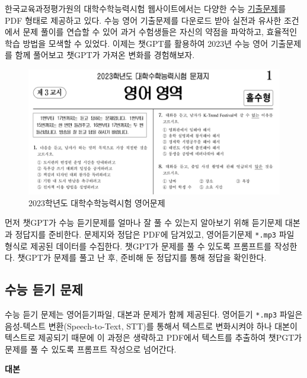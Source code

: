 \documentclass[
  letterpaper,
]{book}
\begin{document}
한국교육과정평가원의 대학수학능력시험 웹사이트에서는 다양한 수능
\href{https://www.suneung.re.kr/boardCnts/list.do?boardID=1500234&m=0403&s=suneung}{기출문제}를
PDF 형태로 제공하고 있다. 수능 영어 기출문제를 다운로드 받아 실전과
유사한 조건에서 문제 풀이를 연습할 수 있어 과거 수험생들은 자신의 약점을
파악하고, 효율적인 학습 방법을 모색할 수 있었다. 이제는 챗GPT를 활용하여
2023년 수능 영어 기출문제를 함께 풀어보고 챗GPT가 가져온 변화를
경험해보자.

\begin{figure}

{\centering \includegraphics{images/sat_english.jpg}

}

\caption{2023학년도 대학수학능력시험 영어문제}

\end{figure}

먼저 챗GPT가 수능 듣기문제를 얼마나 잘 풀 수 있는지 알아보기 위해
듣기문제 대본과 정답지를 준비한다. 문제지와 정답은 PDF에 담겨있고,
영어듣기문제 \texttt{*.mp3} 파일 형식로 제공된 데이터를 수집한다.
챗GPT가 문제를 풀 수 있도록 프롬프트를 작성한다. 챗GPT가 문제를 풀고 난
후, 준비해 둔 정답지를 통해 정답을 확인한다.

\hypertarget{uxc218uxb2a5-uxb4e3uxae30-uxbb38uxc81c}{%
\subsection{수능 듣기
문제}\label{uxc218uxb2a5-uxb4e3uxae30-uxbb38uxc81c}}

수능 듣기 문제는 영어듣기파일, 대본과 문제가 함께 제공된다. 영어듣기
\texttt{*.mp3} 파일은 음성-텍스트 변환(Speech-to-Text, STT)를 통해서
텍스트로 변화시켜야 하나 대본이 텍스트로 제공되기 때문에 이 과정은
생략하고 PDF에서 텍스트를 추출하여 챗PGT가 문제를 풀 수 있도록 프롬프트
작성으로 넘어간다.

\textbf{대본}
\end{document}
